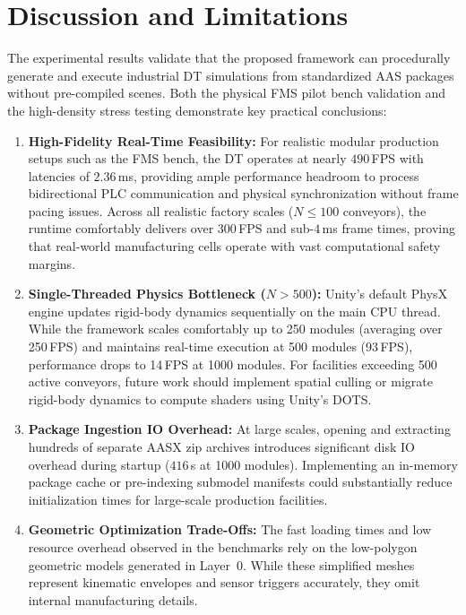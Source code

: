 \section{Discussion and Limitations}
\label{sec:eval_discussion}

The experimental results validate that the proposed framework can procedurally generate and execute industrial \gls{DT} simulations from standardized \gls{AAS} packages without pre-compiled scenes. Both the physical \gls{FMS} pilot bench validation and the high-density stress testing demonstrate key practical conclusions:

\begin{enumerate}
    \item \textbf{High-Fidelity Real-Time Feasibility:} For realistic modular production setups such as the \gls{FMS} bench, the \gls{DT} operates at nearly $490\,$\gls{FPS} with latencies of $2.36\,$ms, providing ample performance headroom to process bidirectional \gls{PLC} communication and physical synchronization without frame pacing issues. Across all realistic factory scales ($N \le 100$ conveyors), the runtime comfortably delivers over $300\,$\gls{FPS} and sub-$4\,$ms frame times, proving that real-world manufacturing cells operate with vast computational safety margins.
    \item \textbf{Single-Threaded Physics Bottleneck ($N > 500$):} Unity's default PhysX engine updates rigid-body dynamics sequentially on the main \gls{CPU} thread. While the framework scales comfortably up to 250 modules (averaging over 250\,\gls{FPS}) and maintains real-time execution at 500 modules (93\,\gls{FPS}), performance drops to 14\,\gls{FPS} at 1000 modules. For facilities exceeding 500 active conveyors, future work should implement spatial culling or migrate rigid-body dynamics to compute shaders using Unity's \gls{DOTS}.
    \item \textbf{Package Ingestion \gls{IO} Overhead:} At large scales, opening and extracting hundreds of separate \gls{AASX} zip archives introduces significant disk \gls{IO} overhead during startup ($416\,$s at 1000 modules). Implementing an in-memory package cache or pre-indexing submodel manifests could substantially reduce initialization times for large-scale production facilities.
    \item \textbf{Geometric Optimization Trade-Offs:} The fast loading times and low resource overhead observed in the benchmarks rely on the low-polygon geometric models generated in Layer~0. While these simplified meshes represent kinematic envelopes and sensor triggers accurately, they omit internal manufacturing details.
\end{enumerate}

